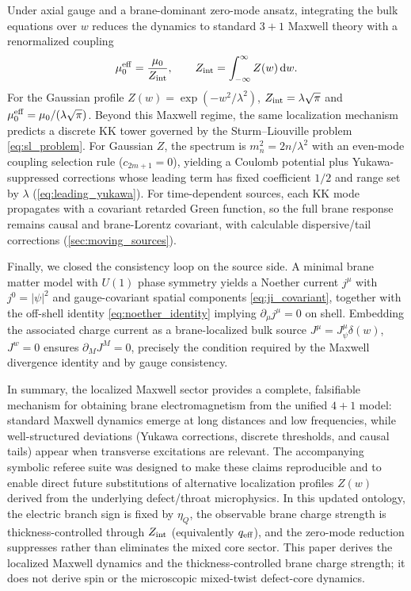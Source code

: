 \documentclass[11pt]{article}
\newcommand{\dd}{\mathrm d}
\newcommand{\J}{J}
\newcommand{\Z}{Z}
\newcommand{\lam}{\lambda}      %
\newcommand{\Zint}{Z_{\rm int}} %
\newcommand{\etaQ}{\eta_Q}
\newcommand{\qeff}{q_{\rm eff}}
\newcommand{\Jpsi}{J_\psi}
\newcommand{\muo}{\mu_0}
\newcommand{\mueff}{\mu_0^{\rm eff}}
\begin{document}
Under axial gauge and a brane-dominant zero-mode ansatz, integrating the bulk
equations over \(w\) reduces the dynamics to standard \(3+1\) Maxwell theory with
a renormalized coupling
\begin{equation}
  \mueff = \frac{\muo}{\Zint},
  \qquad
  \Zint=\int_{-\infty}^{\infty}\Z(w)\,\dd w.
\end{equation}
For the Gaussian profile \(\Z(w)=\exp(-w^2/\lam^2)\), \(\Zint=\lam\sqrt{\pi}\) and
\(\mueff=\muo/(\lam\sqrt{\pi})\). Beyond this Maxwell regime, the same
localization mechanism predicts a discrete KK tower governed by the
Sturm--Liouville problem \cref{eq:sl_problem}. For Gaussian \(\Z\), the spectrum
is \(m_n^2=2n/\lam^2\) with an even-mode coupling selection rule
(\(c_{2m+1}=0\)), yielding a Coulomb potential plus Yukawa-suppressed corrections
whose leading term has fixed coefficient \(1/2\) and range set by \(\lam\)
(\cref{eq:leading_yukawa}). For time-dependent sources, each KK mode propagates
with a covariant retarded Green function, so the full brane response remains
causal and brane-Lorentz covariant, with calculable dispersive/tail corrections
(\cref{sec:moving_sources}).

Finally, we closed the consistency loop on the source side. A minimal brane
matter model with \(U(1)\) phase symmetry yields a Noether current \(j^\mu\) with
\(j^0=|\psi|^2\) and gauge-covariant spatial components \cref{eq:ji_covariant},
together with the off-shell identity \cref{eq:noether_identity} implying
\(\partial_\mu j^\mu=0\) on shell. Embedding the associated charge current as a
brane-localized bulk source \(\J^\mu=\Jpsi^\mu\delta(w)\), \(\J^w=0\) ensures
\(\partial_M\J^M=0\), precisely the condition required by the Maxwell divergence
identity and by gauge consistency.

In summary, the localized Maxwell sector provides a complete, falsifiable
mechanism for obtaining brane electromagnetism from the unified \(4+1\) model:
standard Maxwell dynamics emerge at long distances and low frequencies, while
well-structured deviations (Yukawa corrections, discrete thresholds, and causal
tails) appear when transverse excitations are relevant. The accompanying symbolic
referee suite was designed to make these claims reproducible and to enable direct
future substitutions of alternative localization profiles \(\Z(w)\) derived from
the underlying defect/throat microphysics. In this updated ontology, the electric
branch sign is fixed by \(\etaQ\), the observable brane charge strength is
thickness-controlled through \(\Zint\) (equivalently \(\qeff\)), and the zero-mode
reduction suppresses rather than eliminates the mixed core sector. This paper
derives the localized Maxwell dynamics and the thickness-controlled brane charge
strength; it does not derive spin or the microscopic mixed-twist defect-core
dynamics.
\end{document}

